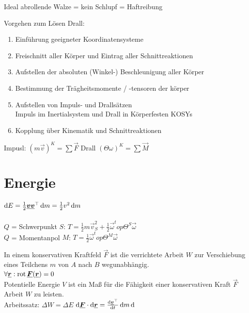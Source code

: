 \documentclass[fs, footer]{latex4ei}
\begin{document}
\begin{multicols}{4}
Ideal abrollende Walze = kein Schlupf = Haftreibung

Vorgehen zum Lösen Drall:
\begin{enumerate}
	\item Einführung geeigneter Koordinatensysteme
	\item Freischnitt aller Körper und Eintrag aller Schnittreaktionen
	\item Aufstellen der absoluten (Winkel-) Beschleunigung aller Körper
	\item Bestimmung der Trägheitsmomente / -tensoren der körper
	\item Aufstellen von Impuls- und Drallsätzen\\
		Impuls im Inertialsystem und Drall in Körperfesten KOSYs
	\item Kopplung über Kinematik und Schnittreaktionen
\end{enumerate}
Impusl: $(m \vec v)^K = \sum \vec F$ \qquad Drall $(\Theta \omega)^K = \sum \vec M$\\

\section{Energie}
$\diff E = \frac{1}{2} \vec v \vec v^\top \diff m = \frac{1}{2} v^2 \diff m$\\
\\
$Q$ = Schwerpunkt $S$: $T = \frac{1}{2} m \vec v_S^2 + \frac{1}{2} \vec \omega^top \Theta^S \vec \omega$\\
$Q$ = Momentanpol $M$: $T = \frac{1}{2} \vec \omega^top \Theta^M \vec \omega$




In einem konservativen Kraftfeld $\vec F$ ist die verrichtete Arbeit $W$ zur Verschiebung eines Teilchens $m$ von $A$ nach $B$ wegunabhängig.\\
$\forall \underline{\boldsymbol {r}}: \operatorname{rot} \underline{\boldsymbol {F}}(\underline{\boldsymbol {r}}) = 0$\\
Potentielle Energie $V$ ist ein Maß für die Fähigkeit einer konservativen Kraft $\vec F$ Arbeit $W$ zu leisten.\\

Arbeitssatz: $\Delta W = \Delta E$
$\diff \vec F \cdot \diff \vec r = \frac{\diff \vec v^\top}{\diff t}\diff m \diff$




\end{multicols}

\end{document}

